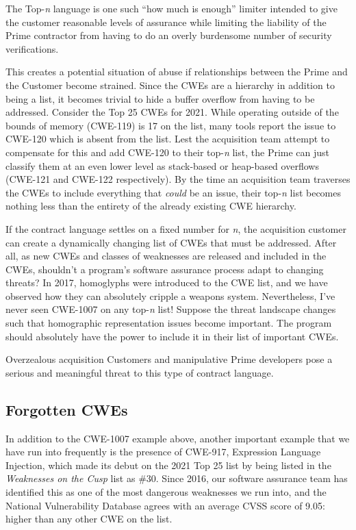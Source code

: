 The Top-\textit{n} language\autocite{20220613:marien} is one such ``how much is enough'' limiter intended to give the customer reasonable levels of assurance while limiting the liability of the Prime contractor from having to do an overly burdensome number of security verifications. 

This creates a potential situation of abuse if relationships between the Prime and the Customer become strained. Since the CWEs are a hierarchy in addition to being a list, it becomes trivial to hide a buffer overflow from having to be addressed. Consider the Top 25 CWEs for 2021.\autocite{20220613:2021Dangerous} While operating outside of the bounds of memory (CWE-119) is 17 on the list, many tools report the issue to CWE-120 which is absent from the list. Lest the acquisition team attempt to compensate for this and add CWE-120 to their top-\textit{n} list, the Prime can just classify them at an even lower level as stack-based or heap-based overflows (CWE-121 and CWE-122 respectively). By the time an acquisition team traverses the CWEs to include everything that \textit{could} be an issue, their top-\textit{n} list becomes nothing less than the entirety of the already existing CWE hierarchy.

If the contract language settles on a fixed number for \textit{n}, the acquisition customer can create a dynamically changing list of CWEs that must be addressed. After all, as new CWEs and classes of weaknesses are released and included in the CWEs, shouldn't a program's software assurance process adapt to changing threats? In 2017, homoglyphs were introduced to the CWE list, and we have observed how they can absolutely cripple a weapons system.\autocites{20220613:hood}{20220613:hood2} Nevertheless, I've never seen CWE-1007 on any top-\textit{n} list! Suppose the threat landscape changes such that homographic representation issues become important. The program should absolutely have the power to include it in their list of important CWEs.

Overzealous acquisition Customers and manipulative Prime developers pose a serious and meaningful threat to this type of contract language.

\subsection{Forgotten CWEs}
In addition to the CWE-1007 example above, another important example that we have run into frequently is the presence of CWE-917, Expression Language Injection, which made its debut on the 2021 Top 25 list by being listed in the \textit{Weaknesses on the Cusp} list as \#30.\autocite{20220613:2021Dangerous} Since 2016, our software assurance team has identified this as one of the most dangerous weaknesses we run into, and the National Vulnerability Database agrees with an average CVSS score of 9.05: higher than any other CWE on the list.

